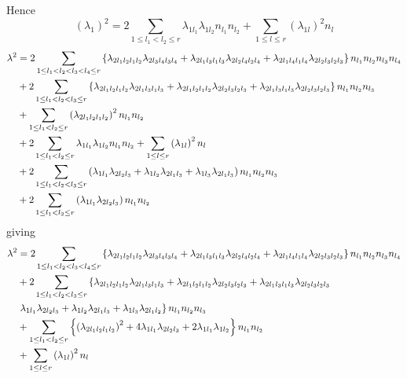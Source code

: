\documentclass[12pt]{article}
\begin{document}
Hence%
\begin{equation}
\left( \lambda _{1}\right) ^{2}=2\sum_{1\leq l_{1}<l_{2}\leq r}\lambda
_{1l_{1}}\lambda _{1l_{2}}n_{l_{1}}n_{l_{2}}+\sum_{1\leq l\leq r}\left(
\lambda _{1l}\right) ^{2}n_{l}
\end{equation}
\begin{align}
\lambda ^{2}& =2\sum_{\substack{ 1\leq l_{1}<l_{2}<l_{3}<l_{4}\leq r}}%
\left\{ \lambda _{2l_{1}l_{2}l_{1}l_{2}}\lambda
_{2l_{3}l_{4}l_{3}l_{4}}+\lambda _{2l_{1}l_{3}l_{1}l_{3}}\lambda
_{2l_{2}l_{4}l_{2}l_{4}}+\lambda _{2l_{1}l_{4}l_{1}l_{4}}\lambda
_{2l_{2}l_{3}l_{2}l_{3}}\right\} n_{l_{1}}n_{l_{2}}n_{l_{3}}n_{l_{4}}  \notag
\\
& +2\sum_{\substack{ 1\leq l_{1}<l_{2}<l_{3}\leq r}}\left\{ \lambda
_{2l_{1}l_{2}l_{1}l_{2}}\lambda _{2l_{1}l_{3}l_{1}l_{3}}+\lambda
_{2l_{1}l_{2}l_{1}l_{2}}\lambda _{2l_{2}l_{3}l_{2}l_{3}}+\lambda
_{2l_{1}l_{3}l_{1}l_{3}}\lambda _{2l_{2}l_{3}l_{2}l_{3}}\right\}
n_{l_{1}}n_{l_{2}}n_{l_{3}}  \notag \\
& +\sum_{\substack{ 1\leq l_{1}<l_{2}\leq r}}\left( \lambda
_{2l_{1}l_{2}l_{1}l_{2}}\right) ^{2}n_{l_{1}}n_{l_{2}}  \notag \\
& +2\sum_{1\leq l_{1}<l_{2}\leq r}\lambda _{1l_{1}}\lambda
_{1l_{2}}n_{l_{1}}n_{l_{2}}+\sum_{1\leq l\leq r}\left( \lambda _{1l}\right)
^{2}n_{l} \\
& +2\sum_{1\leq l_{1}<l_{2}<l_{3}\leq r}\left( \lambda _{1l_{1}}\lambda
_{2l_{2}l_{3}}+\lambda _{1l_{2}}\lambda _{2l_{1}l_{3}}+\lambda
_{1l_{3}}\lambda _{2l_{1}l_{3}}\right) n_{l_{1}}n_{l_{2}}n_{l_{3}} \\
& +2\sum_{1\leq l_{1}<l_{2}\leq r}\left( \lambda _{1l_{1}}\lambda
_{2l_{2}l_{3}}\right) n_{l_{1}}n_{l_{2}}
\end{align}%
giving 
\begin{align}
\lambda ^{2}& =2\sum_{\substack{ 1\leq l_{1}<l_{2}<l_{3}<l_{4}\leq r}}%
\left\{ \lambda _{2l_{1}l_{2}l_{1}l_{2}}\lambda
_{2l_{3}l_{4}l_{3}l_{4}}+\lambda _{2l_{1}l_{3}l_{1}l_{3}}\lambda
_{2l_{2}l_{4}l_{2}l_{4}}+\lambda _{2l_{1}l_{4}l_{1}l_{4}}\lambda
_{2l_{2}l_{3}l_{2}l_{3}}\right\} n_{l_{1}}n_{l_{2}}n_{l_{3}}n_{l_{4}}  \notag
\\
& +2\sum_{\substack{ 1\leq l_{1}<l_{2}<l_{3}\leq r}}\left\{ \lambda
_{2l_{1}l_{2}l_{1}l_{2}}\lambda _{2l_{1}l_{3}l_{1}l_{3}}+\lambda
_{2l_{1}l_{2}l_{1}l_{2}}\lambda _{2l_{2}l_{3}l_{2}l_{3}}+\lambda
_{2l_{1}l_{3}l_{1}l_{3}}\lambda _{2l_{2}l_{3}l_{2}l_{3}}\right.  \notag \\
& \left. \lambda _{1l_{1}}\lambda _{2l_{2}l_{3}}+\lambda _{1l_{2}}\lambda
_{2l_{1}l_{3}}+\lambda _{1l_{3}}\lambda _{2l_{1}l_{2}}\right\}
n_{l_{1}}n_{l_{2}}n_{l_{3}} \\
& +\sum_{\substack{ 1\leq l_{1}<l_{2}\leq r}}\left\{ \left( \lambda
_{2l_{1}l_{2}l_{1}l_{2}}\right) ^{2}+4\lambda _{1l_{1}}\lambda
_{2l_{2}l_{3}}+2\lambda _{1l_{1}}\lambda _{1l_{2}}\right\} n_{l_{1}}n_{l_{2}}
\notag \\
& +\sum_{1\leq l\leq r}\left( \lambda _{1l}\right) ^{2}n_{l}
\end{align}%
\end{document}
